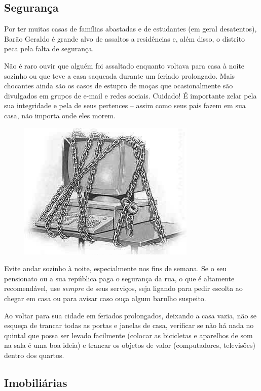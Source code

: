 \subsection{Segurança}

Por ter muitas casas de famílias abastadas e de estudantes (em geral
desatentos), Barão Geraldo é grande alvo de assaltos a residências e, além
disso, o distrito peca pela falta de segurança.

Não é raro ouvir que alguém foi assaltado enquanto voltava para casa à noite
sozinho ou que teve a casa saqueada durante um feriado prolongado. Mais
chocantes ainda são os casos de estupro de moças que ocasionalmente são
divulgados em grupos de e-mail e redes sociais. Cuidado! É importante zelar pela
sua integridade e pela de seus pertences -- assim como seus pais fazem em sua
casa, não importa onde eles morem.

\begin{figure}[h!]
    \centering
    \includegraphics[width=.45\textwidth]{img/barao/seguranca.jpg}
\end{figure}

Evite andar sozinho à noite, especialmente nos fins de semana. Se o seu
pensionato ou a sua república paga o segurança da rua, o que é altamente
recomendável, use \emph{sempre} de seus serviços, seja ligando para pedir
escolta ao chegar em casa ou para avisar caso ouça algum barulho suspeito.

Ao voltar para sua cidade em feriados prolongados, deixando a casa vazia, não se
esqueça de trancar todas as portas e janelas de casa, verificar se não há nada
no quintal que possa ser levado facilmente (colocar as bicicletas e aparelhos de
som na sala é uma boa ideia) e trancar os objetos de valor (computadores,
televisões) dentro dos quartos.

\subsection{Imobiliárias}

